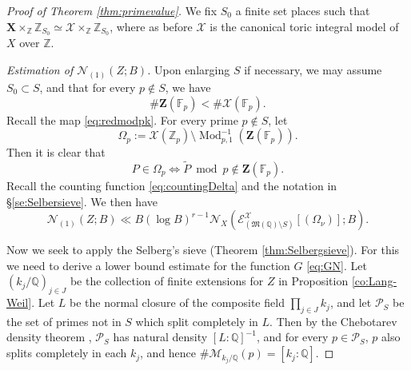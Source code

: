 \documentclass[11pt,letterpaper]{amsart}
\newcommand{\BF}{{\mathbb {F}}}
\newcommand{\BQ}{{\mathbb {Q}}}
\newcommand{\BZ}{{\mathbb {Z}}}
\newcommand{\CE}{{\mathcal {E}}}
\newcommand{\CM}{{\mathcal {M}}}
\newcommand{\CN}{{\mathcal {N}}}
\newcommand{\CP}{{\mathcal {P}}}
\newcommand{\CX}{{\mathcal {X}}}
\theoremstyle{plain}
\numberwithin{equation}{section}
\theoremstyle{definition}
\theoremstyle{remark}
\begin{document}
\begin{proof}[Proof of Theorem \ref{thm:primevalue}]
We fix $S_0$ a finite set places such that $\mathbf{X}\times_{\BZ}\BZ_{S_0}\simeq\CX\times_{\BZ}\BZ_{S_0}$, where as before $\CX$ is the canonical toric integral model of $X$ over $\BZ$. 

\emph{Estimation of $\CN_{(1)}(Z;B)$.}
Upon enlarging $S$ if necessary, we may assume $S_0\subset S$, and that  for every $p\notin S$, we have \begin{equation}\label{eq:ZFpXFp}
	\#\mathbf{Z}(\BF_p)<\#\CX(\BF_p). 
\end{equation}
Recall the map \eqref{eq:redmodpk}. 
For every prime $p\notin S$, let $$\Omega_p:=\CX(\BZ_p)\setminus \operatorname{Mod}_{p,1}^{-1}(\mathbf{Z}(\BF_p)).$$ Then it is clear that
$$P\in\Omega_p\Longleftrightarrow \widetilde{P}\bmod p\notin\mathbf{Z}(\BF_p).$$
Recall the counting function \eqref{eq:countingDelta} and the notation in \S\ref{se:Selbersieve}.
We then have  \begin{equation}\label{eq:splitpN1} \CN_{(1)}(Z;B)\ll  B(\log B)^{r-1}\CN_X(\CE^{\CX}_{(\mathfrak{M}(\BQ)\setminus S)}[(\Omega_\nu)];B).\end{equation}

Now we seek to apply the Selberg's sieve (Theorem \ref{thm:Selbergsieve}). For this we need to derive a lower bound estimate for the function $G$ \eqref{eq:GN}. 
Let $(k_j/\BQ)_{j\in J}$ be the collection of finite extensions for $Z$ in  Proposition \ref{co:Lang-Weil}. Let $L$ be the normal closure of the composite field $\prod_{j\in J}k_j$, and let $\CP_{S}$ be the set of primes not in $S$ which split completely in $L$. Then by the Chebotarev density theorem \cite[Corollary 13.6]{Neukirch}, $\CP_{S}$ has natural density $[L:\BQ]^{-1}$, and for every $p\in \CP_{S}$, $p$ also splits completely in each $k_j$, and hence $\#\CM_{k_j/\BQ}(p)=[k_j:\BQ]$.


\end{proof}
\end{document}
